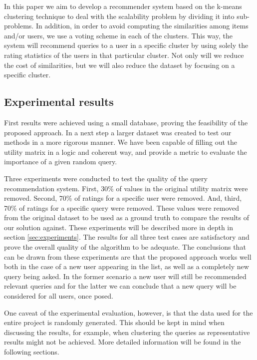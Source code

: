 \documentclass[sigconf]{acmart}
\begin{document}
In this paper we aim to develop a recommender system based on the k-means clustering technique to deal with the scalability problem by dividing it into sub-problems. In addition, in order to avoid computing the similarities among items and/or users, we use a voting scheme in each of the clusters. This way, the system will recommend queries to a user in a specific cluster by using solely the rating statistics of the users in that particular cluster. Not only will we reduce the cost of similarities, but we will also reduce the dataset by focusing on a specific cluster.

\subsection{Experimental results} 
First results were achieved using a small database, proving the feasibility of the proposed approach. In a next step a larger dataset was created to test our methods in a more rigorous manner. We have been capable of filling out the utility matrix in a logic and coherent way, and provide a metric to evaluate the importance of a given random query. 

Three experiments were conducted to test the quality of the query recommendation system. First, 30\% of values in the original utility matrix were removed. Second, 70\% of ratings for a specific user were removed. And, third, 70\% of ratings for a specific query were removed. These values were removed from the original dataset to be used as a ground truth to compare the results of our solution against. These experiments will be described more in depth in section \ref{sec:experiments}. The results for all three test cases are satisfactory and prove the overall quality of the algorithm to be adequate. The conclusions that can be drawn from these experiments are that the proposed approach works well both in the case of a new user appearing in the list, as well as a completely new query being asked. In the former scenario a new user will still be recommended relevant queries and for the latter we can conclude that a new query will be considered for all users, once posed.

One caveat of the experimental evaluation, however, is that the data used for the entire project is randomly generated. This should be kept in mind when discussing the results, for example, when clustering the queries as representative results might not be achieved. More detailed information will be found in the following sections.
\end{document}
